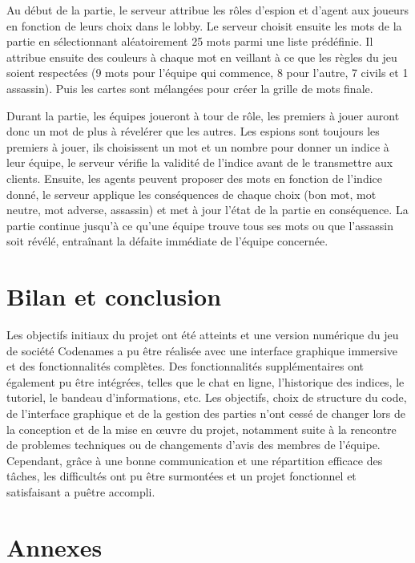 \documentclass[12pt,a4paper]{article}
\begin{document}
        \vspace{0.5cm}

        Au début de la partie, le serveur attribue les rôles d'espion et d'agent aux joueurs en fonction de leurs choix dans le lobby.
        Le serveur choisit ensuite les mots de la partie en sélectionnant aléatoirement 25 mots parmi une liste prédéfinie.
        Il attribue ensuite des couleurs à chaque mot en veillant à ce que les règles du jeu soient respectées (9 mots pour l'équipe qui commence, 8 pour l'autre, 7 civils et 1 assassin).
        Puis les cartes sont mélangées pour créer la grille de mots finale.

        \vspace{0.5cm}

        Durant la partie, les équipes joueront à tour de rôle, les premiers à jouer auront donc un mot de plus à révelérer que les autres.
        Les espions sont toujours les premiers à jouer, ils choisissent un mot et un nombre pour donner un indice à leur équipe, le serveur vérifie la validité de l'indice avant de le transmettre aux clients.
        Ensuite, les agents peuvent proposer des mots en fonction de l'indice donné, le serveur applique les conséquences de chaque choix (bon mot, mot neutre, mot adverse, assassin) et met à jour l'état de la partie en conséquence.
        La partie continue jusqu'à ce qu'une équipe trouve tous ses mots ou que l'assassin soit révélé, entraînant la défaite immédiate de l'équipe concernée.

    \newpage
    \section{Bilan et conclusion}

    Les objectifs initiaux du projet ont été atteints et une version numérique du jeu de société Codenames a pu être réalisée avec une interface graphique immersive et des fonctionnalités complètes.
    Des fonctionnalités supplémentaires ont également pu être intégrées, telles que le chat en ligne, l'historique des indices, le tutoriel, le bandeau d'informations, etc.
    Les objectifs, choix de structure du code, de l'interface graphique et de la gestion des parties n'ont cessé de changer lors de la conception et de la mise en œuvre du projet, notamment suite à la rencontre de problemes techniques ou de changements d'avis des membres de l'équipe.
    Cependant, grâce à une bonne communication et une répartition efficace des tâches, les difficultés ont pu être surmontées et un projet fonctionnel et satisfaisant a puêtre accompli.

    \newpage
    \section{Annexes}
\end{document}
